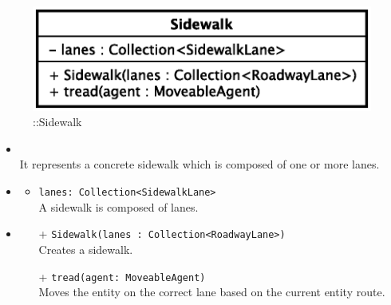 \begin{figure}[h]
\centering
\includegraphics[scale=0.6,keepaspectratio]{images/solution/app/backend/sidewalk.eps}
\caption{\pReactiveComponent::Sidewalk}
\label{fig:sd-app-sidewalk}
\end{figure}
\FloatBarrier
\begin{itemize}
  \item \textbf{\descr} \\
    It represents a concrete sidewalk which is composed of one or more lanes.
  \item \textbf{\attrs}
  \begin{itemize}
    \item \texttt{lanes: Collection<SidewalkLane>} \\
A sidewalk is composed of lanes.
  \end{itemize}
  \item \textbf{\ops}
  \begin{itemize}
  \item[+] \texttt{Sidewalk(lanes : Collection<RoadwayLane>)} \\
    Creates a sidewalk.
    \item[+] \texttt{tread(agent: MoveableAgent)} \\
Moves the entity on the correct lane based on the current entity route. 
  \end{itemize}
\end{itemize}
